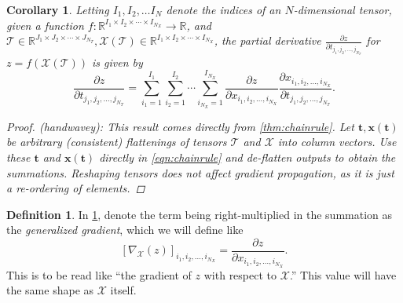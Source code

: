 \documentclass{article}
\renewcommand{\vec}[1]{\bm{{#1}}}
\newcommand{\tensor}[1]{\bm{{\mathcal{#1}}}}
\newcommand{\gradfn}[2]{\nabla_{{#1}}\left({#2}\right)} %
\newtheorem{corollary}{Corollary}[theorem]
\theoremstyle{definition}
\newtheorem{definition}{Definition}[section]
\begin{document}
\begin{corollary}
  Letting $I_1, I_2, \ldots I_N$ denote the indices of an $N$-dimensional tensor, given a function $f : \mathbb{R}^{I_1 \times I_2 \times \cdots \times I_{N_X}} \to \mathbb{R}$, and $\tensor{T}\in \mathbb{R}^{J_1 \times J_2 \times \cdots \times J_{N_T}}, \tensor{X}\left(\tensor{T}\right) \in \mathbb{R}^{I_1 \times I_2 \times \cdots \times I_{N_X}}$, the partial derivative $\frac{\partial z}{\partial t_{j_1,j_2,\ldots,j_{N_T}}}$ for $z=f\left(\tensor{X}\left(\tensor{T}\right)\right)$ is given by
  \begin{equation}
    \frac{\partial z}{\partial t_{j_1,j_2,\ldots,j_{N_T}}} = \sum_{i_1=1}^{I_1} \sum_{i_2=1}^{I_2} \cdots \sum_{i_{N_X}=1}^{I_{N_X}} \frac{\partial z}{\partial x_{i_1, i_2, \ldots, i_{N_X}}} \frac{\partial x_{i_1, i_2, \ldots, i_{N_X}}}{\partial t_{j_1, j_2, \ldots, j_{N_T}}}. \label{eqn:tensorchainrule}
  \end{equation}  \begin{proof} (handwavey): This result comes directly from \cref{thm:chainrule}. Let $\vec{t}, \vec{x}\left(\vec{t}\right)$ be arbitrary (consistent) flattenings of tensors $\tensor{T}$ and $\tensor{X}$ into column vectors.  Use these $\vec{t}$ and $\vec{x}\left(\vec{t}\right)$ directly in \cref{eqn:chainrule} and de-flatten outputs to obtain the summations.  Reshaping tensors does not affect gradient propagation, as it is just a re-ordering of elements. \end{proof}
  \label{cor:tensorchainrule}
\end{corollary}

\begin{definition}
  In \cref{cor:tensorchainrule}, denote the term being right-multiplied in the summation as the \textit{generalized gradient}, which we will define like
  \begin{equation}
    \left[\gradfn{\tensor{X}}{z}\right]_{i_1,i_2,\ldots,i_{N_X}} = \frac{\partial z}{\partial x_{i_1,i_2,\ldots,i_{N_X}}}. \label{eqn:gradfn}
  \end{equation}
  This is to be read like ``the gradient of $z$ with respect to $\tensor{X}$.''  This value will have the same shape as $\tensor{X}$ itself.
\end{definition}
\end{document}
